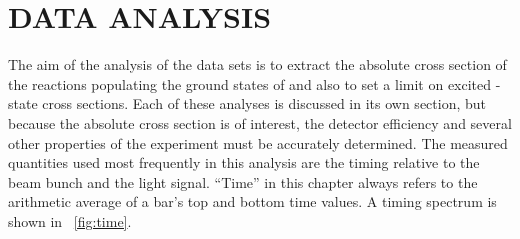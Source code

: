 %
%
%
%
%
%
%
%

%
%

\chapter{DATA ANALYSIS}
\label{chap:dataAnalysis}

The aim of the analysis of the \reaction data sets is to extract the absolute cross section of the reactions populating the ground states of \SeProducts and also to set a limit on excited \zp-state cross sections.  Each of these analyses is discussed in its own section, but because the absolute cross section is of interest, the detector efficiency and several other properties of the experiment must be accurately determined.  The measured quantities used most frequently in this analysis are the timing relative to the beam bunch and the light signal.  ``Time'' in this chapter always refers to the arithmetic average of a bar's top and bottom time values.  A timing spectrum is shown in {\fig}~\ref{fig:time}.
